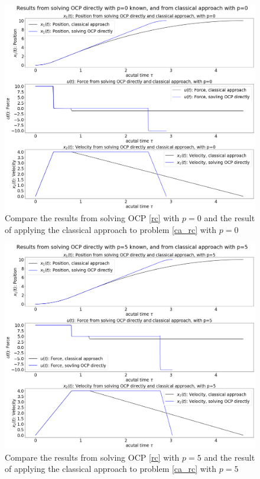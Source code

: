 \documentclass  [
  paper    = a4,
  BCOR     = 10mm,
  twoside,
  fontsize = 12pt,
  fleqn,
  toc      = bibnumbered,
  toc      = listofnumbered,
  numbers  = noendperiod,
  headings = normal,
  listof   = leveldown,
  version  = 3.03
]                                       {scrreprt}
\newcommand{\<}{\langle}
\renewcommand{\>}{\rangle}
\begin{document}


\begin{figure}[H]
	\centerline{\includegraphics[width=12.5cm]{ca_compare_p0.png}}
	\caption{Compare the results from solving OCP \ref{rc} with $p=0$ and the result of applying the classical approach to problem \ref{ca_rc} with $p=0$}
	\label{fig_ca_compare_p0}
\end{figure}

\begin{figure}[H]
	\centerline{\includegraphics[width=12.5cm]{ca_compare_p5.png}}
	\caption{Compare the results from solving OCP \ref{rc} with $p=5$ and the result of applying the classical approach to problem \ref{ca_rc} with $p=5$}
	\label{fig_ca_compare_p5}
\end{figure}
\end{document}

